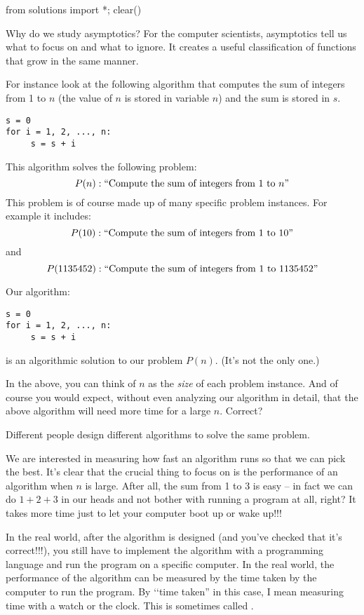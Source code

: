 \begin{python0}
from solutions import *; clear()
\end{python0}

Why do we study asymptotics? For the computer scientists,
asymptotics tell us what to focus on and what to ignore.
It creates a useful classification of functions that grow in the
same manner. 

For instance look at the following algorithm that
computes the sum of integers from 1 to $n$ (the value of $n$ is
stored in variable $n$) and the sum is stored in
$s$.
\begin{Verbatim}[frame=single, fontsize=\footnotesize]
s = 0
for i = 1, 2, ..., n:
     s = s + i
\end{Verbatim}
This algorithm solves the following problem:
\[
P(n): \text{\lq\lq Compute the sum of integers from $1$ to $n$''}
\]
This problem is of course made up of many specific problem instances.
For example it includes: 
\[
P(10): \text{\lq\lq Compute the sum of integers from $1$ to $10$''}
\]
and
\[ 
P(1135452): \text{\lq\lq Compute the sum of integers from $1$ to $1135452$''}
\]

Our algorithm:
\begin{Verbatim}[frame=single, fontsize=\footnotesize]
s = 0
for i = 1, 2, ..., n:
     s = s + i
\end{Verbatim}
is an algorithmic solution to our problem $P(n)$.
(It's not the only one.)

In the above, you can think of $n$ as the \textit{size} of each problem
instance.
And of course you would expect, without even analyzing our
algorithm in detail, that the above algorithm will need more time
for a large $n$. Correct?

Different people design different algorithms to solve the same problem.

We are interested in measuring how fast an algorithm runs
so that we can pick the best.
It's clear that the crucial thing to focus on is the performance
of an algorithm when $n$ is large.
After all, the sum from 1 to 3 is easy --
in fact we can do $1+2+3$ in our heads and not bother with
running a program at all, right?
It takes more time just to let your computer boot up or wake up!!!

In the real world, 
after the algorithm is designed (and you've checked that it's 
correct!!!), 
you still have to implement the algorithm with a programming language
and run the program on a specific computer.
In the real world, the performance of the algorithm can be measured by the
time taken by the computer to run the program.
By \lq\lq time taken'' in this case, I mean measuring time with a
watch or the clock.
This is sometimes called .

